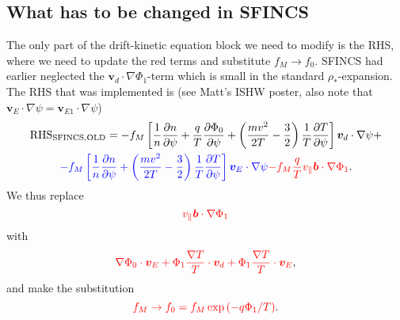 \documentclass[12pt]{article}
\newcommand{\p}{\partial}
\newcommand{\remark}[1]{\textbf{\textcolor{red}{REMARK: #1}}}
\newcommand{\na}{\nabla}
\begin{document}
\subsection*{What has to be changed in SFINCS}
The only part of the drift-kinetic equation block we need to modify is the RHS, where we need to update the red terms and substitute $f_M \rightarrow f_0$. SFINCS had earlier neglected the $\bm{v}_d \cdot  \na \Phi_1$-term which is small in the standard $\rho_\ast$-expansion. 
The RHS that was implemented is (see Matt's ISHW poster, also note that $\bm{v}_{E} \cdot \na \psi = \bm{v}_{E1} \cdot \na \psi$)
\begin{multline}
{\mathrm{RHS}}_{\mathrm{SFINCS, OLD}} =
- f_M \left[\frac{1}{n} \frac{\p n}{\p \psi} + \frac{q}{T} \frac{\p \Phi_0}{\p \psi} + \left(\frac{m v^2}{2 T} - \frac{3}{2}\right) \frac{1}{T} \frac{\p T}{\p \psi}\right] 
\bm{v}_d \cdot \na \psi + \\  
\textcolor{blue}{- f_M \left[\frac{1}{n} \frac{\p n}{\p \psi} + \left(\frac{m v^2}{2 T} - \frac{3}{2}\right) \frac{1}{T} \frac{\p T}{\p \psi}\right] 
\bm{v}_{E} \cdot \na \psi}  %
\textcolor{red}{- f_M \frac{q}{T} v_\| \bm{b} \cdot  \na \Phi_1 }.
\label{eq:DriftKineticSFINCSOldRHS}
\end{multline}
We thus replace 
\begin{equation}
\textcolor{red}{
v_\| \bm{b} \cdot  \na \Phi_1
}
\label{eq:ReplaceOLD}
\end{equation}
with 
\begin{equation}
\textcolor{red}{
\na \Phi_0 \cdot \bm{v}_{E} + \Phi_1 \frac{\na T}{T} \cdot \bm{v}_d + \Phi_1 \frac{\na T}{T} \cdot \bm{v}_{E}},
\label{eq:ReplaceNEW}
\end{equation}
and make the substitution
\begin{equation}
\textcolor{red}{
f_M \rightarrow f_0 = f_M \exp \left(- q \Phi_1 / T \right)}.
\label{eq:substitution}
\end{equation}
\\
\end{document}
